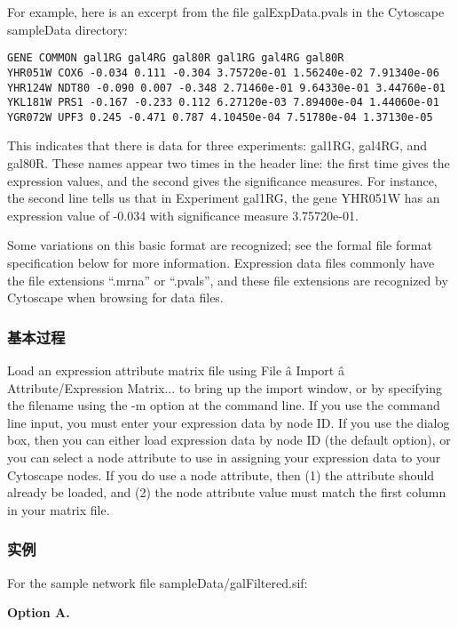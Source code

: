  For example, here is an excerpt from the file galExpData.pvals in the Cytoscape sampleData directory: 

 \begin{verbatim}
GENE COMMON gal1RG gal4RG gal80R gal1RG gal4RG gal80R
YHR051W COX6 -0.034 0.111 -0.304 3.75720e-01 1.56240e-02 7.91340e-06
YHR124W NDT80 -0.090 0.007 -0.348 2.71460e-01 9.64330e-01 3.44760e-01
YKL181W PRS1 -0.167 -0.233 0.112 6.27120e-03 7.89400e-04 1.44060e-01
YGR072W UPF3 0.245 -0.471 0.787 4.10450e-04 7.51780e-04 1.37130e-05

\end{verbatim}

 This indicates that there is data for three experiments: gal1RG, gal4RG, and gal80R. These names appear two times in the header line: the first time gives the expression values, and the second gives the significance measures. For instance, the second line tells us that in Experiment gal1RG, the gene YHR051W has an expression value of -0.034 with significance measure 3.75720e-01. 

 Some variations on this basic format are recognized; see the formal file format specification below for more information. Expression data files commonly have the file extensions ``.mrna'' or ``.pvals'', and these file extensions are recognized by Cytoscape when browsing for data files. 
 
\subsubsection{基本过程}
 Load an expression attribute matrix file using File \^a Import \^a Attribute/Expression Matrix... to bring up the import window, or by specifying the filename using the -m option at the command line. If you use the command line input, you must enter your expression data by node ID. If you use the dialog box, then you can either load expression data by node ID (the default option), or you can select a node attribute to use in assigning your expression data to your Cytoscape nodes. If you do use a node attribute, then (1) the attribute should already be loaded, and (2) the node attribute value must match the first column in your matrix file. 
 
\subsubsection{实例}
 For the sample network file sampleData/galFiltered.sif: 

 \textbf{Option A.}


